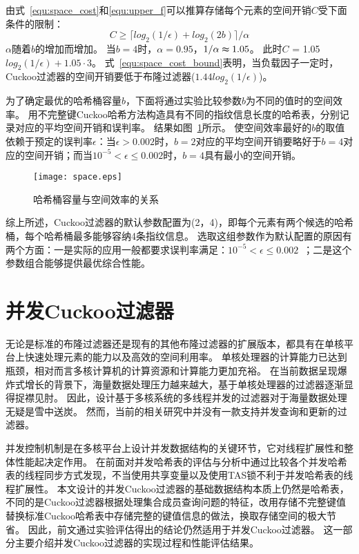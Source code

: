 由式~\ref{equ:space_cost}和\ref{equ:upper_f}可以推算存储每个元素的空间开销$C$受下面条件的限制：
\begin{equation}
C \geq {\lceil log_2({1/\epsilon}) + log_2(2b)\rceil /\alpha}
\label{equ:space_cost_bound}
\end{equation}
$\alpha$随着$b$的增加而增加。
当$b = 4$时，$\alpha = 0.95$，${1/\alpha} \thickapprox 1.05$。
此时$C$ = 1.05$log_2({1/\epsilon}) + 1.05\cdot 3$。
式~\ref{equ:space_cost_bound}表明，当负载因子一定时，Cuckoo过滤器的空间开销要低于布隆过滤器($1.44log_2({1/\epsilon})$)。

为了确定最优的哈希桶容量$b$，下面将通过实验比较参数$b$为不同的值时的空间效率。
用不完整键Cuckoo哈希方法构造具有不同的指纹信息长度的哈希表，分别记录对应的平均空间开销和误判率。
结果如图~\ref{fig:cbf_space}所示。
使空间效率最好的$b$的取值依赖于预定的误判率$\epsilon$：当$\epsilon > 0.002 $时，$b = 2$对应的平均空间开销要略好于$b = 4$对应的空间开销；而当$ 10^{-5} < \epsilon \leq 0.002$时，$b = 4$具有最小的空间开销。

\begin{figure}[htbp]
\centering
\texttt{[image: space.eps]}
\caption{哈希桶容量与空间效率的关系}
\label{fig:cbf_space}
\end{figure}

综上所述，Cuckoo过滤器的默认参数配置为(2，4)，即每个元素有两个候选的哈希桶，每个哈希桶最多能够容纳4条指纹信息。
选取这组参数作为默认配置的原因有两个方面：一是实际的应用一般都要求误判率满足：$ 10^{-5} < \epsilon \leq 0.002$~\cite{broder2004network}；二是这个参数组合能够提供最优综合性能。

\section{并发Cuckoo过滤器}
无论是标准的布隆过滤器还是现有的其他布隆过滤器的扩展版本，都具有在单核平台上快速处理元素的能力以及高效的空间利用率。
单核处理器的计算能力已达到瓶颈，相对而言多核计算机的计算资源和计算能力更加充裕。
在当前数据呈现爆炸式增长的背景下，海量数据处理压力越来越大，基于单核处理器的过滤器逐渐显得捉襟见肘。
因此，设计基于多核系统的多线程并发的过滤器对于海量数据处理无疑是雪中送炭。
然而，当前的相关研究中并没有一款支持并发查询和更新的过滤器。

并发控制机制是在多核平台上设计并发数据结构的关键环节，它对线程扩展性和整体性能起决定作用。
在前面对并发哈希表的评估与分析中通过比较各个并发哈希表的线程同步方式发现，不当使用共享变量以及使用TAS锁不利于并发哈希表的线程扩展性。
本文设计的并发Cuckoo过滤器的基础数据结构本质上仍然是哈希表，不同的是Cuckoo过滤器根据处理集合成员查询问题的特征，改用存储不完整键值替换标准Cuckoo哈希表中存储完整的键值信息的做法，换取存储空间的极大节省。
因此，前文通过实验评估得出的结论仍然适用于并发Cuckoo过滤器。
这一部分主要介绍并发Cuckoo过滤器的实现过程和性能评估结果。

